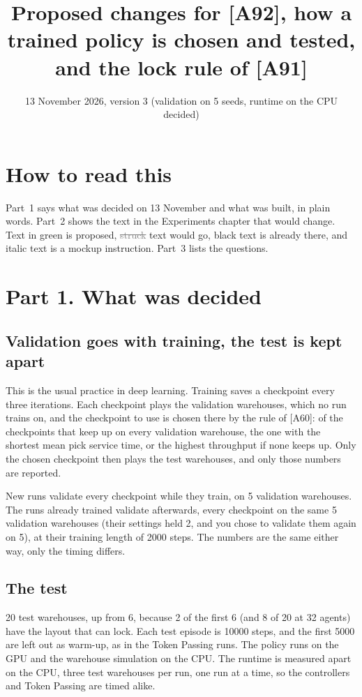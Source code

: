 \documentclass[11pt,a4paper]{article}
\title{Proposed changes for [A92], how a trained policy is chosen and tested, and the lock rule of [A91]}
\date{13 November 2026, version 3 (validation on 5 seeds, runtime on the CPU decided)}
\newcommand{\new}[1]{\textcolor{newc}{#1}}
\newcommand{\old}[1]{\textcolor{gray}{\st{#1}}}
\begin{document}
\maketitle

\section*{How to read this}
Part~1 says what was decided on 13 November and what was built, in plain words.
Part~2 shows the text in the Experiments chapter that would change. Text in
\new{green} is proposed, \old{struck} text would go, black text is already
there, and italic text is a mockup instruction. Part~3 lists the questions.

\section*{Part 1. What was decided}

\subsection*{Validation goes with training, the test is kept apart}
This is the usual practice in deep learning. Training saves a checkpoint every
three iterations. Each checkpoint plays the validation warehouses, which no run
trains on, and the checkpoint to use is chosen there by the rule of [A60]: of the
checkpoints that keep up on every validation warehouse, the one with the shortest
mean pick service time, or the highest throughput if none keeps up. Only the
chosen checkpoint then plays the test warehouses, and only those numbers are
reported.

New runs validate every checkpoint while they train, on 5 validation warehouses.
The runs already trained validate afterwards, every checkpoint on the same 5
validation warehouses (their settings held 2, and you chose to validate them
again on 5), at their training length of 2000 steps. The numbers are the same
either way, only the timing differs.

\subsection*{The test}
20 test warehouses, up from 6, because 2 of the first 6 (and 8 of 20 at 32
agents) have the layout that can lock. Each test episode is 10000 steps, and the
first 5000 are left out as warm-up, as in the Token Passing runs. The policy runs
on the GPU and the warehouse simulation on the CPU. The runtime is measured
apart on the CPU, three test warehouses per run, one run at a time, so the
controllers and Token Passing are timed alike.
\end{document}
